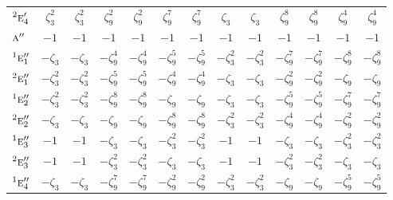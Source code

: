 \documentclass[10pt,a4paper]{article}
\numberwithin{equation}{section}
\newcommand{\irr}[1]{\text{\normalfont\scshape #1}}
\newcommand{\conjpair}[1]{{}^{#1}}
\newcommand{\rootunity}[1]{\zeta_{#1}}
\begin{document}
{\begin{longtable}{@{}lcccccccccccc@{}}
$\conjpair{2}\irr{e}_{4}'$ & $\rootunity{3}^{2}$ & $\rootunity{3}^{2}$ & $\rootunity{9}^{2}$ & $\rootunity{9}^{2}$ & $\rootunity{9}^{7}$ & $\rootunity{9}^{7}$ & $\rootunity{3}$ & $\rootunity{3}$ & $\rootunity{9}^{8}$ & $\rootunity{9}^{8}$ & $\rootunity{9}^{4}$ & $\rootunity{9}^{4}$\\
$\irr{a}''$ & $-1$ & $-1$ & $-1$ & $-1$ & $-1$ & $-1$ & $-1$ & $-1$ & $-1$ & $-1$ & $-1$ & $-1$\\
$\conjpair{1}\irr{e}_{1}''$ & $-\rootunity{3}$ & $-\rootunity{3}$ & $-\rootunity{9}^{4}$ & $-\rootunity{9}^{4}$ & $-\rootunity{9}^{5}$ & $-\rootunity{9}^{5}$ & $-\rootunity{3}^{2}$ & $-\rootunity{3}^{2}$ & $-\rootunity{9}^{7}$ & $-\rootunity{9}^{7}$ & $-\rootunity{9}^{8}$ & $-\rootunity{9}^{8}$\\
$\conjpair{2}\irr{e}_{1}''$ & $-\rootunity{3}^{2}$ & $-\rootunity{3}^{2}$ & $-\rootunity{9}^{5}$ & $-\rootunity{9}^{5}$ & $-\rootunity{9}^{4}$ & $-\rootunity{9}^{4}$ & $-\rootunity{3}$ & $-\rootunity{3}$ & $-\rootunity{9}^{2}$ & $-\rootunity{9}^{2}$ & $-\rootunity{9}$ & $-\rootunity{9}$\\
$\conjpair{1}\irr{e}_{2}''$ & $-\rootunity{3}^{2}$ & $-\rootunity{3}^{2}$ & $-\rootunity{9}^{8}$ & $-\rootunity{9}^{8}$ & $-\rootunity{9}$ & $-\rootunity{9}$ & $-\rootunity{3}$ & $-\rootunity{3}$ & $-\rootunity{9}^{5}$ & $-\rootunity{9}^{5}$ & $-\rootunity{9}^{7}$ & $-\rootunity{9}^{7}$\\
$\conjpair{2}\irr{e}_{2}''$ & $-\rootunity{3}$ & $-\rootunity{3}$ & $-\rootunity{9}$ & $-\rootunity{9}$ & $-\rootunity{9}^{8}$ & $-\rootunity{9}^{8}$ & $-\rootunity{3}^{2}$ & $-\rootunity{3}^{2}$ & $-\rootunity{9}^{4}$ & $-\rootunity{9}^{4}$ & $-\rootunity{9}^{2}$ & $-\rootunity{9}^{2}$\\
$\conjpair{1}\irr{e}_{3}''$ & $-1$ & $-1$ & $-\rootunity{3}$ & $-\rootunity{3}$ & $-\rootunity{3}^{2}$ & $-\rootunity{3}^{2}$ & $-1$ & $-1$ & $-\rootunity{3}$ & $-\rootunity{3}$ & $-\rootunity{3}^{2}$ & $-\rootunity{3}^{2}$\\
$\conjpair{2}\irr{e}_{3}''$ & $-1$ & $-1$ & $-\rootunity{3}^{2}$ & $-\rootunity{3}^{2}$ & $-\rootunity{3}$ & $-\rootunity{3}$ & $-1$ & $-1$ & $-\rootunity{3}^{2}$ & $-\rootunity{3}^{2}$ & $-\rootunity{3}$ & $-\rootunity{3}$\\
$\conjpair{1}\irr{e}_{4}''$ & $-\rootunity{3}$ & $-\rootunity{3}$ & $-\rootunity{9}^{7}$ & $-\rootunity{9}^{7}$ & $-\rootunity{9}^{2}$ & $-\rootunity{9}^{2}$ & $-\rootunity{3}^{2}$ & $-\rootunity{3}^{2}$ & $-\rootunity{9}$ & $-\rootunity{9}$ & $-\rootunity{9}^{5}$ & $-\rootunity{9}^{5}$\\

\end{longtable}}
\end{document}
